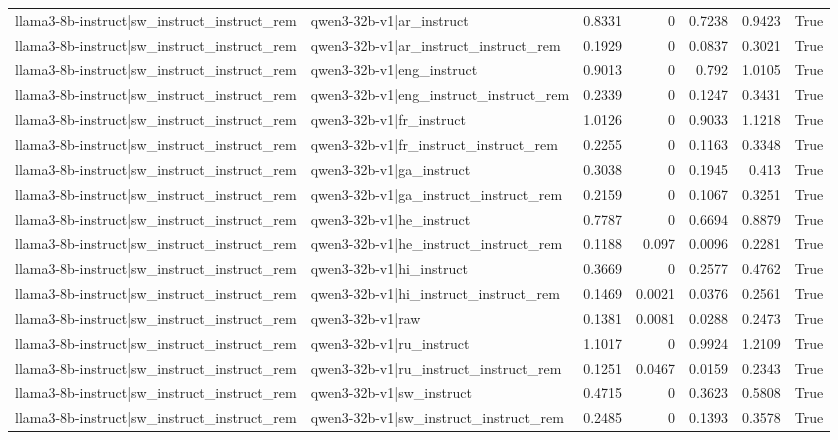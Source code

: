 \begin{table}
\begin{tabular}{l l r r r r l}
llama3-8b-instruct|sw_instruct_instruct_rem & qwen3-32b-v1|ar_instruct & 0.8331 & 0 & 0.7238 & 0.9423 & True \\
llama3-8b-instruct|sw_instruct_instruct_rem & qwen3-32b-v1|ar_instruct_instruct_rem & 0.1929 & 0 & 0.0837 & 0.3021 & True \\
llama3-8b-instruct|sw_instruct_instruct_rem & qwen3-32b-v1|eng_instruct & 0.9013 & 0 & 0.792 & 1.0105 & True \\
llama3-8b-instruct|sw_instruct_instruct_rem & qwen3-32b-v1|eng_instruct_instruct_rem & 0.2339 & 0 & 0.1247 & 0.3431 & True \\
llama3-8b-instruct|sw_instruct_instruct_rem & qwen3-32b-v1|fr_instruct & 1.0126 & 0 & 0.9033 & 1.1218 & True \\
llama3-8b-instruct|sw_instruct_instruct_rem & qwen3-32b-v1|fr_instruct_instruct_rem & 0.2255 & 0 & 0.1163 & 0.3348 & True \\
llama3-8b-instruct|sw_instruct_instruct_rem & qwen3-32b-v1|ga_instruct & 0.3038 & 0 & 0.1945 & 0.413 & True \\
llama3-8b-instruct|sw_instruct_instruct_rem & qwen3-32b-v1|ga_instruct_instruct_rem & 0.2159 & 0 & 0.1067 & 0.3251 & True \\
llama3-8b-instruct|sw_instruct_instruct_rem & qwen3-32b-v1|he_instruct & 0.7787 & 0 & 0.6694 & 0.8879 & True \\
llama3-8b-instruct|sw_instruct_instruct_rem & qwen3-32b-v1|he_instruct_instruct_rem & 0.1188 & 0.097 & 0.0096 & 0.2281 & True \\
llama3-8b-instruct|sw_instruct_instruct_rem & qwen3-32b-v1|hi_instruct & 0.3669 & 0 & 0.2577 & 0.4762 & True \\
llama3-8b-instruct|sw_instruct_instruct_rem & qwen3-32b-v1|hi_instruct_instruct_rem & 0.1469 & 0.0021 & 0.0376 & 0.2561 & True \\
llama3-8b-instruct|sw_instruct_instruct_rem & qwen3-32b-v1|raw & 0.1381 & 0.0081 & 0.0288 & 0.2473 & True \\
llama3-8b-instruct|sw_instruct_instruct_rem & qwen3-32b-v1|ru_instruct & 1.1017 & 0 & 0.9924 & 1.2109 & True \\
llama3-8b-instruct|sw_instruct_instruct_rem & qwen3-32b-v1|ru_instruct_instruct_rem & 0.1251 & 0.0467 & 0.0159 & 0.2343 & True \\
llama3-8b-instruct|sw_instruct_instruct_rem & qwen3-32b-v1|sw_instruct & 0.4715 & 0 & 0.3623 & 0.5808 & True \\
llama3-8b-instruct|sw_instruct_instruct_rem & qwen3-32b-v1|sw_instruct_instruct_rem & 0.2485 & 0 & 0.1393 & 0.3578 & True \\

\end{tabular}
\end{table}

